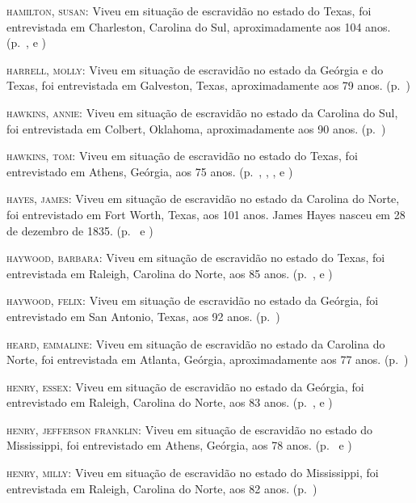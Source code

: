 \begin{Parskip}
\textsc{hamilton, susan:} Viveu em situação de escravidão no estado do Texas, foi entrevistada
em Charleston, Carolina do Sul, aproximadamente aos 104 anos. (p.~\pageref{ref119}, \pageref{ref120} e \pageref{ref121})

\textsc{harrell, molly:} Viveu em situação de escravidão no estado da Geórgia e do Texas, foi
entrevistada em Galveston, Texas, aproximadamente aos 79 anos. (p.~\pageref{ref122})

\textsc{hawkins, annie:} Viveu em situação de escravidão no estado da Carolina do Sul, foi
entrevistada em Colbert, Oklahoma, aproximadamente aos 90 anos. (p.~\pageref{ref123})

\textsc{hawkins, tom:} Viveu em situação de escravidão no estado do Texas, foi entrevistado em
Athens, Geórgia, aos 75 anos. (p.~\pageref{ref124}, \pageref{ref125}, \pageref{ref126}, \pageref{ref127} e \pageref{ref128})

\textsc{hayes, james:} Viveu em situação de escravidão no estado da Carolina do Norte, foi
entrevistado em Fort Worth, Texas, aos 101 anos. James Hayes nasceu em
28 de dezembro de 1835. (p.~\pageref{ref129} e \pageref{ref130})


\textsc{haywood, barbara:} Viveu em situação de escravidão no estado do Texas, foi entrevistada
em Raleigh, Carolina do Norte, aos 85 anos. (p.~\pageref{ref131}, \pageref{ref132} e \pageref{ref133})

\textsc{haywood, felix:} Viveu em situação de escravidão no estado da Geórgia, foi entrevistado
em San Antonio, Texas, aos 92 anos. (p.~\pageref{ref134})

\textsc{heard, emmaline:} Viveu em situação de escravidão no estado da Carolina do Norte, foi
entrevistada em Atlanta, Geórgia, aproximadamente aos 77 anos. (p.~\pageref{ref135})

\textsc{henry, essex:} Viveu em situação de escravidão no estado da Geórgia, foi entrevistado em
Raleigh, Carolina do Norte, aos 83 anos. (p.~\pageref{ref136}, \pageref{ref137} e \pageref{ref138})

\textsc{henry, jefferson franklin:} Viveu em situação de escravidão no estado do Mississippi,
foi entrevistado em Athens, Geórgia, aos 78 anos. (p.~\pageref{ref139} e \pageref{ref140})

\textsc{henry, milly:} Viveu em situação de escravidão no estado do Mississippi, foi
entrevistada em Raleigh, Carolina do Norte, aos 82 anos. (p.~\pageref{ref141})


\end{Parskip}
